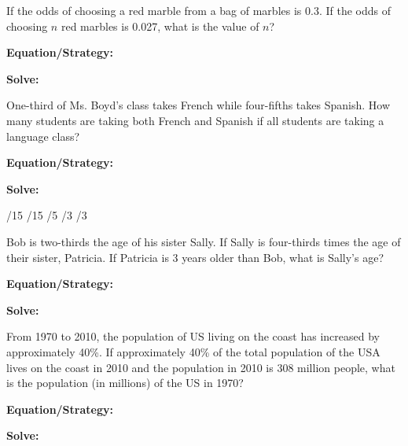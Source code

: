 \vfill
\newpage
\begin{multicols*}{2}
\begin{outline}[enumerate]
\medium

\1 If the odds of choosing a red marble from a bag of marbles is 0.3. If the odds of choosing $n$ red marbles is 0.027, what is the value of $n$?

\bigskip
\textbf{Equation/Strategy:} \hrulefill

\bigskip
\textbf{Solve:}

\vfill
{}

\midline

\1 One-third of Ms. Boyd's class takes French while four-fifths takes Spanish. How many students are taking both French and Spanish if all students are taking a language class?

\bigskip
\textbf{Equation/Strategy:} \hrulefill

\bigskip
\textbf{Solve:}

\vfill
{}/15
/15
/5
/3
/3

\columnbreak
\advanced

\1 Bob is two-thirds the age of his sister Sally. If Sally is four-thirds times the age of their sister, Patricia. If Patricia is 3 years older than Bob, what is Sally's age?

\bigskip
\textbf{Equation/Strategy:} \hrulefill

\bigskip
\textbf{Solve:}

\vfill
{}

\midline

\1 From 1970 to 2010, the population of US living on the coast has increased by approximately 40\%. If approximately 40\% of the total population of the USA lives on the coast in 2010 and the population in 2010 is 308 million people, what is the population (in millions) of the US in 1970?

\bigskip
\textbf{Equation/Strategy:} \hrulefill

\bigskip
\textbf{Solve:}

\vfill
{}
\end{outline}
\end{multicols*}